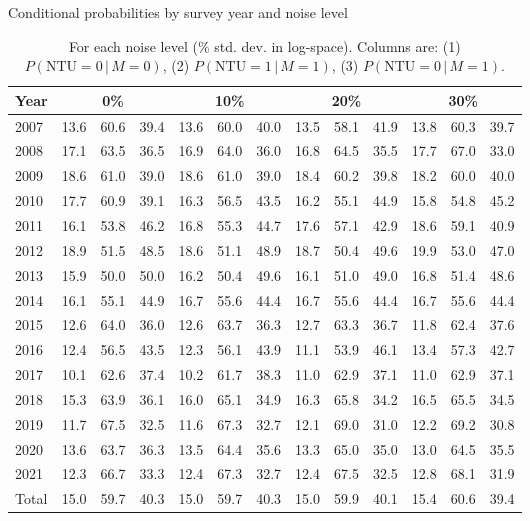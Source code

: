 \begin{table}[htbp]
\small
\centering
\caption{Conditional probabilities by survey year and noise level}
\begin{tabular}{l|ccc|ccc|ccc|ccc}
\toprule
Year & \multicolumn{3}{c|}{0\%} & \multicolumn{3}{c|}{10\%} & \multicolumn{3}{c|}{20\%} & \multicolumn{3}{c}{30\%} \\
\midrule
2007 & 13.6 & 60.6 & 39.4 & 13.6 & 60.0 & 40.0 & 13.5 & 58.1 & 41.9 & 13.8 & 60.3 & 39.7 \\
2008 & 17.1 & 63.5 & 36.5 & 16.9 & 64.0 & 36.0 & 16.8 & 64.5 & 35.5 & 17.7 & 67.0 & 33.0 \\
2009 & 18.6 & 61.0 & 39.0 & 18.6 & 61.0 & 39.0 & 18.4 & 60.2 & 39.8 & 18.2 & 60.0 & 40.0 \\
2010 & 17.7 & 60.9 & 39.1 & 16.3 & 56.5 & 43.5 & 16.2 & 55.1 & 44.9 & 15.8 & 54.8 & 45.2 \\
2011 & 16.1 & 53.8 & 46.2 & 16.8 & 55.3 & 44.7 & 17.6 & 57.1 & 42.9 & 18.6 & 59.1 & 40.9 \\
2012 & 18.9 & 51.5 & 48.5 & 18.6 & 51.1 & 48.9 & 18.7 & 50.4 & 49.6 & 19.9 & 53.0 & 47.0 \\
2013 & 15.9 & 50.0 & 50.0 & 16.2 & 50.4 & 49.6 & 16.1 & 51.0 & 49.0 & 16.8 & 51.4 & 48.6 \\
2014 & 16.1 & 55.1 & 44.9 & 16.7 & 55.6 & 44.4 & 16.7 & 55.6 & 44.4 & 16.7 & 55.6 & 44.4 \\
2015 & 12.6 & 64.0 & 36.0 & 12.6 & 63.7 & 36.3 & 12.7 & 63.3 & 36.7 & 11.8 & 62.4 & 37.6 \\
2016 & 12.4 & 56.5 & 43.5 & 12.3 & 56.1 & 43.9 & 11.1 & 53.9 & 46.1 & 13.4 & 57.3 & 42.7 \\
2017 & 10.1 & 62.6 & 37.4 & 10.2 & 61.7 & 38.3 & 11.0 & 62.9 & 37.1 & 11.0 & 62.9 & 37.1 \\
2018 & 15.3 & 63.9 & 36.1 & 16.0 & 65.1 & 34.9 & 16.3 & 65.8 & 34.2 & 16.5 & 65.5 & 34.5 \\
2019 & 11.7 & 67.5 & 32.5 & 11.6 & 67.3 & 32.7 & 12.1 & 69.0 & 31.0 & 12.2 & 69.2 & 30.8 \\
2020 & 13.6 & 63.7 & 36.3 & 13.5 & 64.4 & 35.6 & 13.3 & 65.0 & 35.0 & 13.0 & 64.5 & 35.5 \\
2021 & 12.3 & 66.7 & 33.3 & 12.4 & 67.3 & 32.7 & 12.4 & 67.5 & 32.5 & 12.8 & 68.1 & 31.9 \\
\midrule
Total & 15.0 & 59.7 & 40.3 & 15.0 & 59.7 & 40.3 & 15.0 & 59.9 & 40.1 & 15.4 & 60.6 & 39.4 \\
\bottomrule
\end{tabular}
\caption{\small{
 For each noise level (\% std. dev. in log-space). Columns are:
(1) $P(\mathrm{NTU}=0\,|\,M=0)$,
(2) $P(\mathrm{NTU}=1\,|\,M=1)$,
(3) $P(\mathrm{NTU}=0\,|\,M=1)$.
}}
\label{tab:conditional_probs_noise}
\end{table}
